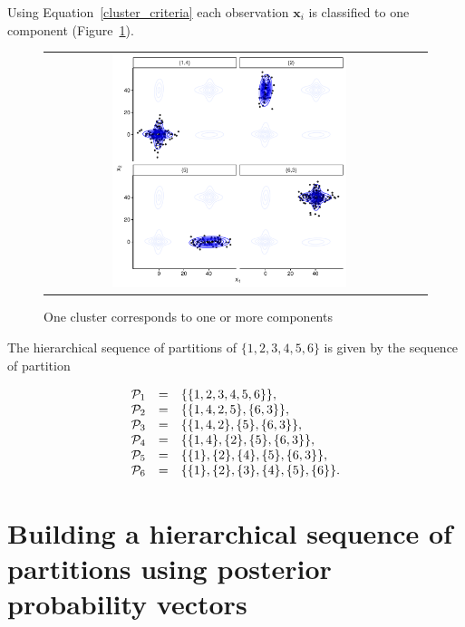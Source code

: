\documentclass[10pt, a4paper]{article}
\newcommand{\m}[1]{\boldsymbol{#1}}
\begin{document}
\begin{spacing}{1.9}
Using Equation~\ref{cluster_criteria} each observation $\m x_i$ is classified to one component (Figure~\ref{ex_two_one}).

\begin{figure}[h]
\begin{center}
\begin{tabular}{cc}
  \includegraphics[width=0.65\textwidth]{figures/partition-example-part4.pdf} \\
 \end{tabular}
 \caption{One cluster corresponds to one or more components}\label{ex_two_one}
\end{center}
\end{figure}


The hierarchical sequence of partitions of $\{1, 2, 3, 4, 5, 6\}$ is given by the sequence of partition

\begin{equation}
\begin{array}{r c l}
\mathcal{P}_1 &=& \{\{1, 2, 3, 4, 5, 6\}\}, \\
\mathcal{P}_2 &=& \{\{1, 4, 2, 5\}, \{6, 3\} \},  \\
\mathcal{P}_3 &=& \{\{1, 4, 2\}, \{5\}, \{6, 3\} \}, \\
\mathcal{P}_4 &=& \{\{1, 4\},\{2\}, \{5\}, \{6, 3\} \}, \\
\mathcal{P}_5 &=& \{\{1\},\{2\},\{4\},\{5\},\{6,3\} \},\\
\mathcal{P}_6 &=& \{\{1\},\{2\},\{3\},\{4\},\{5\},\{6\}\}.
\end{array}
\label{hier_ex}
\end{equation}

\section{Building a hierarchical sequence of partitions using posterior probability vectors}\label{generic_merging}


\end{spacing}
\end{document}
